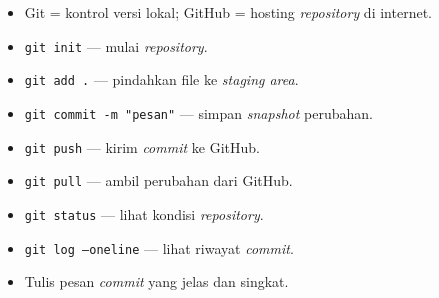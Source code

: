 \begin{itemize}
  \item Git = kontrol versi lokal; GitHub = hosting \emph{repository} di internet.
  \item \texttt{git init} --- mulai \emph{repository}.
  \item \texttt{git add .} --- pindahkan file ke \emph{staging area}.
  \item \texttt{git commit -m "pesan"} --- simpan \emph{snapshot} perubahan.
  \item \texttt{git push} --- kirim \emph{commit} ke GitHub.
  \item \texttt{git pull} --- ambil perubahan dari GitHub.
  \item \texttt{git status} --- lihat kondisi \emph{repository}.
  \item \texttt{git log --oneline} --- lihat riwayat \emph{commit}.
  \item Tulis pesan \emph{commit} yang jelas dan singkat.
\end{itemize}
